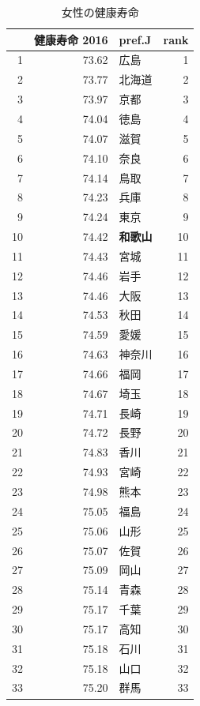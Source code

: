 \begin{table}[ht]
\centering
\footnotesize
\caption{女性の健康寿命}
\begin{tabular}{rrlr}
  \hline
 & 健康寿命 2016 & pref.J & rank \\
  \hline
1 & 73.62 & 広島 &   1 \\
  2 & 73.77 & 北海道 &   2 \\
  3 & 73.97 & 京都 &   3 \\
  4 & 74.04 & 徳島 &   4 \\
  5 & 74.07 & 滋賀 &   5 \\
  6 & 74.10 & 奈良 &   6 \\
  7 & 74.14 & 鳥取 &   7 \\
  8 & 74.23 & 兵庫 &   8 \\
  9 & 74.24 & 東京 &   9 \\
  10 & 74.42 & \textbf{和歌山} &  10 \\
  11 & 74.43 & 宮城 &  11 \\
  12 & 74.46 & 岩手 &  12 \\
  13 & 74.46 & 大阪 &  13 \\
  14 & 74.53 & 秋田 &  14 \\
  15 & 74.59 & 愛媛 &  15 \\
  16 & 74.63 & 神奈川 &  16 \\
  17 & 74.66 & 福岡 &  17 \\
  18 & 74.67 & 埼玉 &  18 \\
  19 & 74.71 & 長崎 &  19 \\
  20 & 74.72 & 長野 &  20 \\
  21 & 74.83 & 香川 &  21 \\
  22 & 74.93 & 宮崎 &  22 \\
  23 & 74.98 & 熊本 &  23 \\
  24 & 75.05 & 福島 &  24 \\
  25 & 75.06 & 山形 &  25 \\
  26 & 75.07 & 佐賀 &  26 \\
  27 & 75.09 & 岡山 &  27 \\
  28 & 75.14 & 青森 &  28 \\
  29 & 75.17 & 千葉 &  29 \\
  30 & 75.17 & 高知 &  30 \\
  31 & 75.18 & 石川 &  31 \\
  32 & 75.18 & 山口 &  32 \\
  33 & 75.20 & 群馬 &  33 \\

\end{tabular}
\end{table}
